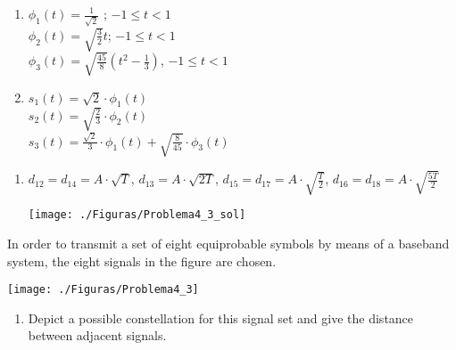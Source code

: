 \documentclass[es,boletin]{uah}
\begin{document}
{
\begin{enumerate}
	\item $\phi_1(t) = \frac{1}{\sqrt{2}}$ ; $-1 \leq t < 1$\\
	 $\phi_2(t) = \sqrt{\frac{3}{2}}t$; $-1 \leq t < 1$\\
	 $\phi_3(t) = \sqrt{\frac{45}{8}}\left ( t^2 - \frac{1}{3}\right )$, $-1 \leq t < 1$
	\item $s_1(t) = \sqrt{2}\cdot \phi_1(t)$\\
		 $s_2(t)=\sqrt{\frac{2}{3}} \cdot \phi_2(t)$\\
		  $s_3(t) = \frac{\sqrt{2}}{3}\cdot \phi_1(t) + \sqrt{\frac{8}{45}} \cdot \phi_3(t)$
\end{enumerate}
}


{
\begin{enumerate}
	\item $d_{12} = d_{14} = A \cdot \sqrt{T}$, $d_{13} = A \cdot \sqrt{2T}$, $d_{15}=d_{17} = A \cdot \sqrt{\frac{T}{2}}$, $d_{16}=d_{18} = A \cdot \sqrt{\frac{5T}{2}}$
	 
{\begin{figure*}[h!]\centering\texttt{[image: ./Figuras/Problema4\_3\_sol]}\end{figure*}}

\end{enumerate}
}
{

In order to transmit a set of eight equiprobable symbols by means of a baseband system, the eight signals in the figure are chosen.


{\begin{figure*}[h!]\centering\texttt{[image: ./Figuras/Problema4\_3]}\end{figure*}}


\begin{enumerate}
	\item Depict a possible constellation for this signal set and give the distance between adjacent signals.
\end{enumerate}

}
\end{document}

